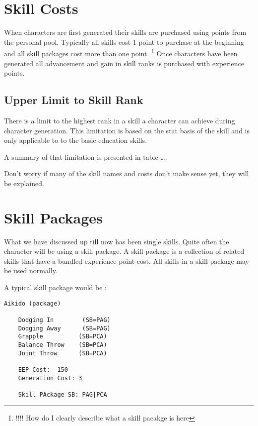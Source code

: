 \section{Skill Costs}

When characters are first generated their skills are purchased
using points from the personal pool. Typically all skills cost 1 point 
to purchase at the beginning and all skill packages cost more than
one point.
\footnote{!!!! How do I clearly describe what a skill pacakge is here}
Once characters have been generated all advancement and gain in skill
ranks is purchased with experience points.

\subsection{Upper Limit to Skill Rank}

There is a limit to the highest rank in a skill a character can
achieve during character generation. This limitation
is based on the stat basis of the skill and is only applicable to to
the basic education skills.

A summary of that limitation is presented in table \dots.



Don't worry if many of the skill names and costs don't make sense
yet, they will be explained.

\section{Skill Packages}

What we have discussed up till now has been single skills.
Quite often the character will be using a skill package.
A skill package is a collection of related skills that have a bundled 
experience point cost. All skills in a skill package may be used 
normally.

A typical skill package would be :

\begin{verbatim}
Aikido (package)

	Dodging In		  (SB=PAG)
	Dodging Away	  (SB=PAG)
	Grapple			 (SB=PCA)
	Balance Throw	 (SB=PCA)
	Joint Throw		 (SB=PCA)

	EEP Cost:  150
	Generation Cost: 3

	Skill PAckage SB: PAG|PCA

\end{verbatim}

